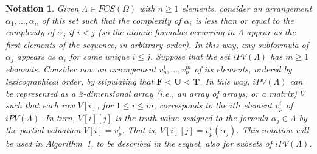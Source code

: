 \documentclass[12pt]{article}
\newtheorem{notation}[theorem]{Notation}
\newcommand{\bT}{\mathbf{T}}
\newcommand{\bU}{\mathbf{U}}
\newcommand{\bF}{\mathbf{F}}
\begin{document}
\begin{notation}\label{remark:requirements} 
Given $\Lambda \in FCS(\Omega)$ with $n\geq 1$ elements, consider an arrangement $\alpha_1, \ldots,\alpha_n$ of this set such that the complexity of $\alpha_i$ is less than or equal to the complexity of  $\alpha_j$ if $i < j$ (so the atomic formulas occurring in $\Lambda$ appear as the first elements of the sequence, in arbitrary order). In this way, any subformula of  $\alpha_j$ appears as  $\alpha_i$ for some unique $i\leq j$. Suppose that the set $iPV(\Lambda)$ has $m \geq 1$ elements. Consider now an arrangement $v_p^1, \ldots, v_p^m$ of its elements, ordered by lexicographical order, by stipulating that $\bF < \bU < \bT$. In this way, $iPV(\Lambda)$ can be represented as a 2-dimensional array (i.e., an array of arrays, or a matrix) $V$ such that each row $V[i]$, for $1 \leq i \leq m$, corresponds to the $ith$ element $v_p^i$ of $iPV(\Lambda)$. In turn, $V[i][j]$ is the truth-value assigned to the formula $\alpha_j \in \Lambda$ by the partial valuation $V[i]= v_p^i$. That is, $V[i][j] = v_p^i(\alpha_j)$. This notation will be used in Algorithm~1, to be described in the sequel, also for subsets of  $iPV(\Lambda)$.
\end{notation}

\
\end{document}
